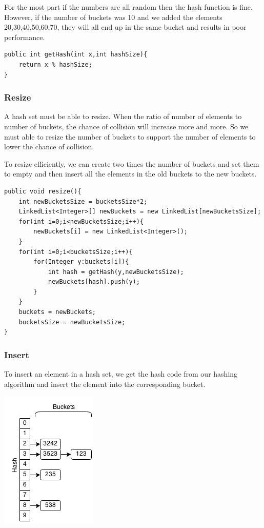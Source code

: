 \documentclass[11pt,oneside]{book}
\makeatletter
\def\maxwidth#1{\ifdim\Gin@nat@width>#1 #1\else\Gin@nat@width\fi}
\makeatother
\begin{document}
For the most part if the numbers are all random then the hash function is fine. However, if the number of buckets was 10 and we added the elements 20,30,40,50,60,70, they will all end up in the same bucket and results in poor performance.

\begin{lstlisting}
public int getHash(int x,int hashSize){
    return x % hashSize;
}
\end{lstlisting}

\subsubsection{Resize}

A hash set must be able to resize. When the ratio of number of elements to number of buckets, the chance of collision will increase more and more. So we must able to resize the number of buckets to support the number of elements to lower the chance of collision.

To resize efficiently, we can create two times the number of buckets and set them to empty and then insert all the elements in the old buckets to the new buckets.

\begin{lstlisting}
public void resize(){
    int newBucketsSize = bucketsSize*2;
    LinkedList<Integer>[] newBuckets = new LinkedList[newBucketsSize];
    for(int i=0;i<newBucketsSize;i++){
        newBuckets[i] = new LinkedList<Integer>();
    }
    for(int i=0;i<bucketsSize;i++){
        for(Integer y:buckets[i]){
            int hash = getHash(y,newBucketsSize);
            newBuckets[hash].push(y);
        }
    }
    buckets = newBuckets;
    bucketsSize = newBucketsSize;
}
\end{lstlisting}

\subsubsection{Insert}

To insert an element in a hash set, we get the hash code from our hashing algorithm and insert the element into the corresponding bucket.

\vspace{5px}\includegraphics[width=\maxwidth{\textwidth}]{hashset.png}
\end{document}
